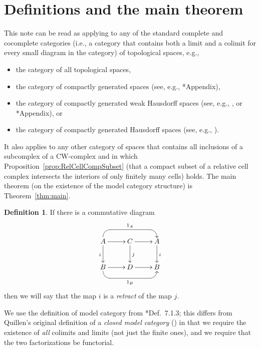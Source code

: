 \documentclass{amsart}
\numberwithin{equation}{section}
\theoremstyle{slplain}
\theoremstyle{definition}
\newtheorem{defn}[equation]{Definition} %
\theoremstyle{remark}
\newcommand{\thmref}{Theorem~\ref}
\newcommand{\propref}{Proposition~\ref}
\begin{document}
\section{Definitions and the main theorem}
\label{sec:MCdef}

This note can be read as applying to any of the standard complete and
cocomplete categories (i.e., a category that contains both a limit and
a colimit for every small diagram in the category) of topological
spaces, e.g.,
\begin{itemize}
\item the category of all topological spaces,
\item the category of compactly generated spaces (see, e.g.,
  \cite{Boardman-Vogt}*{Appendix}),
\item the category of compactly generated weak Hausdorff spaces (see,
  e.g., \cite{Strickland}, or \cite{Fritsch-Piccinini}*{Appendix}), or
\item the category of compactly generated Hausdorff spaces (see, e.g.,
  \cite{Steenrod}).
\end{itemize}
It also applies to any other category of spaces that contains all
inclusions of a subcomplex of a CW-complex and in which
\propref{prop:RelCellCompSubset} (that a compact subset of a relative
cell complex intersects the interiors of only finitely many cells)
holds.  The main theorem (on the existence of the model category
structure) is \thmref{thm:main}.

\begin{defn}
  \label{def:retract}
  If there is a commutative diagram
  \begin{displaymath}
    \xymatrix{
      {A} \ar[r] \ar[d]_{i} 
           \ar `u[rr] `[drr]^{1_{A}} [rr]+<0pt,6pt>
        & {C} \ar[r] \ar[d]^{j}
        & {A} \ar[d]^{i}\\
      {B} \ar[r]
           \ar `d[rr] `[urr]_{1_{B}} [rr]
        & {D} \ar[r]
        & {B}
    }
  \end{displaymath}
  then we will say that the map $i$ is a \emph{retract} of the map
  $j$.
\end{defn}

We use the definition of model category from
\cite{MCATL}*{Def.~7.1.3}; this differs from Quillen's original
definition of a \emph{closed model category} (\cites{Q:HomAlg,Q:RHT})
in that we require the existence of \emph{all} colimits and limits
(not just the finite ones), and we require that the two factorizations
be functorial.
\end{document}
